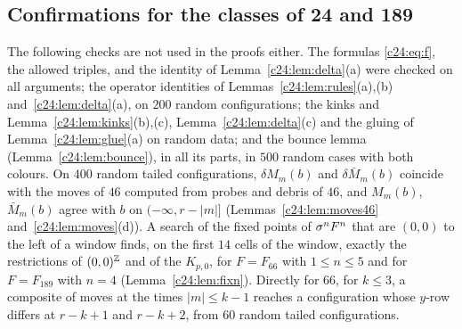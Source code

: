 \subsection{Confirmations for the classes of 24 and 189}\label{app:confirm24}
The following checks are not used in the proofs either. The formulas \eqref{c24:eq:f}, the allowed triples, and the identity of Lemma~\ref{c24:lem:delta}(a) were checked on all arguments; the operator identities of Lemmas~\ref{c24:lem:rules}(a),(b) and~\ref{c24:lem:delta}(a), on $200$ random configurations; the kinks and Lemma~\ref{c24:lem:kinks}(b),(c), Lemma~\ref{c24:lem:delta}(c) and the gluing of Lemma~\ref{c24:lem:glue}(a) on random data; and the bounce lemma (Lemma~\ref{c24:lem:bounce}), in all its parts, in $500$ random cases with both colours. On $400$ random tailed configurations, $\delta M_m(b)$ and $\delta\bar M_m(b)$ coincide with the moves of $46$ computed from probes and debris of $46$, and $M_m(b)$, $\bar M_m(b)$ agree with $b$ on $(-\infty,r-|m|]$ (Lemmas~\ref{c24:lem:moves46} and~\ref{c24:lem:moves}(d)). A search of the fixed points of $\sigma^nF^n$ that are $(0,0)$ to the left of a window finds, on the first $14$ cells of the window, exactly the restrictions of $(0,0)^{\mathbb{Z}}$ and of the $K_{p,0}$, for $F=F_{66}$ with $1\le n\le5$ and for $F=F_{189}$ with $n=4$ (Lemma~\ref{c24:lem:fixn}). Directly for $66$, for $k\le3$, a composite of moves at the times $|m|\le k-1$ reaches a configuration whose $y$-row differs at $r-k+1$ and $r-k+2$, from $60$ random tailed configurations.



